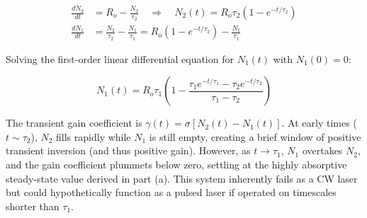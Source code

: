 \begin{align*}
  \frac{dN_2}{dt} &= R_o - \frac{N_2}{\tau_2} \quad\Longrightarrow\quad N_2(t) = R_o\tau_2(1 - e^{-t/\tau_2}) \\[1ex]
  \frac{dN_1}{dt} &= \frac{N_2}{\tau_2} - \frac{N_1}{\tau_1} = R_o(1 - e^{-t/\tau_2}) - \frac{N_1}{\tau_1}
\end{align*}

Solving the first-order linear differential equation for $N_1(t)$ with $N_1(0)=0$:

\begin{equation*}
  N_1(t) = R_o\tau_1 \left( 1 - \frac{\tau_1 e^{-t/\tau_1} - \tau_2 e^{-t/\tau_2}}{\tau_1 - \tau_2} \right)
\end{equation*}

The transient gain coefficient is $\gamma(t) = \sigma [N_2(t) - N_1(t)]$. At early times ($t \sim \tau_2$), $N_2$ fills rapidly while $N_1$ is still empty, creating a brief window of positive transient inversion (and thus positive gain). However, as $t \to \tau_1$, $N_1$ overtakes $N_2$, and the gain coefficient plummets below zero, settling at the highly absorptive steady-state value derived in part (a).
This system inherently fails as a CW laser but could hypothetically function as a pulsed laser if operated on timescales shorter than $\tau_1$.
